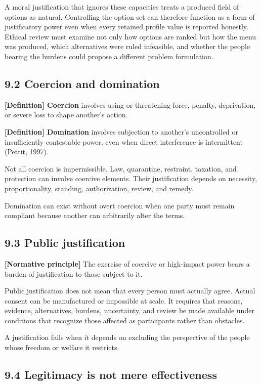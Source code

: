 \documentclass[
  11pt,
]{article}
\begin{document}
A moral justification that ignores these capacities treats a produced
field of options as natural. Controlling the option set can therefore
function as a form of justificatory power even when every retained
profile value is reported honestly. Ethical review must examine not only
how options are ranked but how the menu was produced, which alternatives
were ruled infeasible, and whether the people bearing the burdens could
propose a different problem formulation.

\subsection{9.2 Coercion and domination}\label{coercion-and-domination}

\textbf{{[}Definition{]} Coercion} involves using or threatening force,
penalty, deprivation, or severe loss to shape another's action.

\textbf{{[}Definition{]} Domination} involves subjection to another's
uncontrolled or insufficiently contestable power, even when direct
interference is intermittent (Pettit, 1997).

Not all coercion is impermissible. Law, quarantine, restraint, taxation,
and protection can involve coercive elements. Their justification
depends on necessity, proportionality, standing, authorization, review,
and remedy.

Domination can exist without overt coercion when one party must remain
compliant because another can arbitrarily alter the terms.

\subsection{9.3 Public justification}\label{public-justification}

\textbf{{[}Normative principle{]}} The exercise of coercive or
high-impact power bears a burden of justification to those subject to
it.

Public justification does not mean that every person must actually
agree. Actual consent can be manufactured or impossible at scale. It
requires that reasons, evidence, alternatives, burdens, uncertainty, and
review be made available under conditions that recognize those affected
as participants rather than obstacles.

A justification fails when it depends on excluding the perspective of
the people whose freedom or welfare it restricts.

\subsection{9.4 Legitimacy is not mere
effectiveness}\label{legitimacy-is-not-mere-effectiveness}
\end{document}
